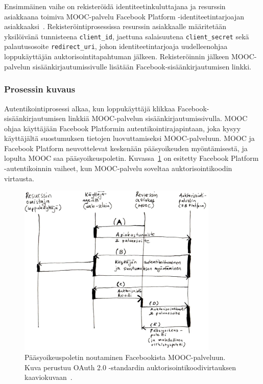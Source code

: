 \documentclass[finnish,gradu]{tktltiki}
\begin{document}
  Ensimmäinen vaihe on rekisteröidä identiteetinkuluttajana ja resurssin asiakkaana toimiva MOOC-palvelu Facebook Platform -identiteetin\-tarjoajan asiakkaaksi~\cite{facebook_oauth2_doc}. Rekisteröintiprosessissa resurssin asiakkaalle määritetään yksilöivänä tunnisteena \verb!client_id!, jaettuna salaisuutena \verb!client_secret! sekä palautusosoite \verb!redirect_uri!, johon identiteetintarjoaja uudelleenohjaa loppukäyttäjän auktorisointitapahtuman jälkeen. Rekisteröinnin jälkeen MOOC-palvelun sisäänkirjautumissivulle lisätään Fa\-ce\-book-si\-sään\-kirjautumisen linkki.


  \subsubsection{Prosessin kuvaus} %
  \label{ssub:autentikoinnin_vaiheet_facebook_platform_palveluun}

  Autentikointiprosessi alkaa, kun loppukäyttäjä klikkaa Facebook-sisään\-kirjau\-tumi\-sen linkkiä MOOC-palvelun sisäänkirjautumissivulla. MOOC ohjaa käyttäjään Facebook Platformin autentikointirajapintaan, joka kysyy käyttäjältä suostumuksen tietojen luovuttamiseksi MOOC-palveluun. MOOC ja Facebook Platform neuvottelevat keskenään pääsyoikeuden myöntämisestä, ja lopulta MOOC saa pääsyoikeuspoletin. Kuvassa~\ref{fig:oauth_auth_code_flow} on esitetty Facebook Platform -autentikoinnin vaiheet, kun MOOC-palvelu soveltaa auktorisointikoodin virtausta.

  \begin{figure}[h!]
    \centering
    \includegraphics[width=0.85\textwidth]{images/fb_auth_sekvenssi.jpg}
    \caption[Pääsyoikeuspoletin noutaminen Facebookista MOOC-palveluun.]{Pääsyoikeuspoletin noutaminen Facebookista MOOC-palveluun. Kuva perustuu OAuth 2.0 -standardin auktorisointikoodivirtauksen kaaviokuvaan~\cite{ietf_oauth2}.}
    \label{fig:oauth_auth_code_flow}
  \end{figure}
\end{document}

